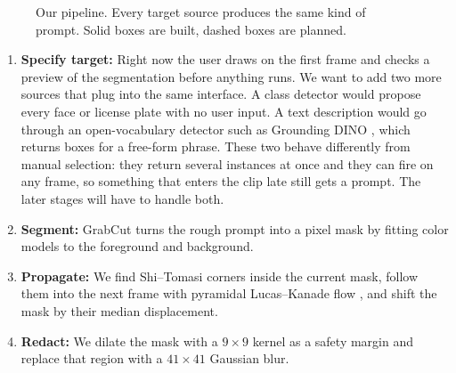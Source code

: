 \documentclass[10pt,letterpaper]{article}
\begin{document}
\begin{figure}[h]
\caption{Our pipeline. Every target source produces the same kind of prompt. Solid boxes are built,
dashed boxes are planned.}
\label{fig:pipeline}
\end{figure}

\begin{enumerate}
\item \textbf{Specify target:} Right now the user draws on the first frame and checks a preview of
the segmentation before anything runs. We want to add two more sources that plug into the same
interface. A class detector would propose every face or license plate with no user input. A text
description would go through an open-vocabulary detector such as Grounding DINO \cite{gdino}, which
returns boxes for a free-form phrase. These two behave differently from manual selection: they
return several instances at once and they can fire on any frame, so something that enters the clip
late still gets a prompt. The later stages will have to handle both.
\item \textbf{Segment:} GrabCut \cite{grabcut} turns the rough prompt into a pixel mask by fitting
color models to the foreground and background.
\item \textbf{Propagate:} We find Shi--Tomasi corners \cite{shitomasi} inside the current mask,
follow them into the next frame with pyramidal Lucas--Kanade flow \cite{lk}, and shift the mask by
their median displacement.
\item \textbf{Redact:} We dilate the mask with a $9{\times}9$ kernel as a safety margin and replace
that region with a $41{\times}41$ Gaussian blur.
\end{enumerate}
\end{document}
